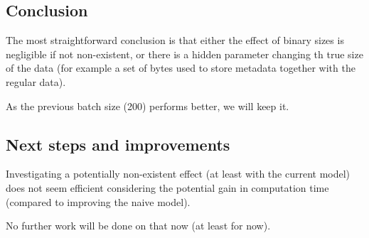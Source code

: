 \subsection{Conclusion}

The most straightforward conclusion is that either the effect of binary
sizes is negligible if not non-existent, or there is a hidden parameter
changing th true size of the data (for example a set of bytes used to
store metadata together with the regular data).

As the previous batch size (200) performs better, we will keep it.

\subsection{Next steps and
improvements}

Investigating a potentially non-existent effect (at least with the
current model) does not seem efficient considering the potential gain in
computation time (compared to improving the naive model).

No further work will be done on that now (at least for now).
